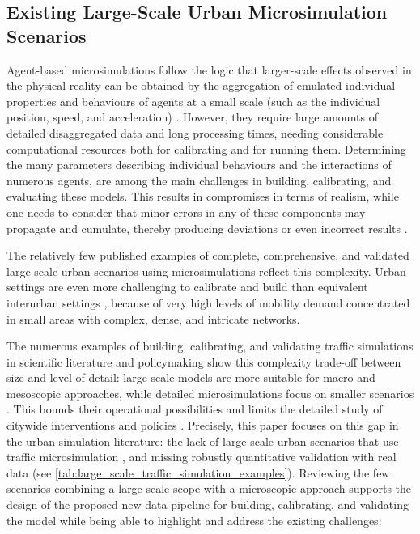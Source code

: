\subsection{Existing Large-Scale Urban Microsimulation Scenarios}
\label{subsec:GR_1.1_existing_large_scale_micro}

Agent-based microsimulations follow the logic that larger-scale effects observed in the physical reality can be obtained by the aggregation of emulated individual properties and behaviours of agents at a small scale (such as the individual position, speed, and acceleration) \citep{Helbing2010}. However, they require large amounts of detailed disaggregated data and long processing times, needing considerable computational resources both for calibrating and for running them. Determining the many parameters describing individual behaviours and the interactions of numerous agents, are among the main challenges in building, calibrating, and evaluating these models. This results in compromises in terms of realism, while one needs to consider that minor errors in any of these components may propagate and cumulate, thereby producing deviations or even incorrect results \citep{Heppenstall2012}.

The relatively few published examples of complete, comprehensive, and validated large-scale urban scenarios using microsimulations reflect this complexity. Urban settings are even more challenging to calibrate and build than equivalent interurban settings \citep{Kastner2014,Urquiza-Aguiar2019}, because of very high levels of mobility demand concentrated in small areas with complex, dense, and intricate networks.

The numerous examples of building, calibrating, and validating traffic simulations in scientific literature and policymaking \citep{Hourdos2008,Balakrishna2007,Oketch2005,Bartin2018,Rodriguez-Rey2021,Bassolas2019} show this complexity trade-off between size and level of detail: large-scale models are more suitable for macro and mesoscopic approaches, while detailed microsimulations focus on smaller scenarios \citep{Saidallah2016}. This bounds their operational possibilities and limits the detailed study of citywide interventions and policies \citep{Hardy2008}. Precisely, this paper focuses on this gap in the urban simulation literature: the lack of large-scale urban scenarios that use traffic microsimulation \citep{McKenney2013,Soares2014,Bieker2015}, and missing robustly quantitative validation with real data \citep{McKenney2013,Uppoor2011,Codeca2018,Rapelli2019,Behrisch2019,Gueriau2020,PereiraMachado2020} (see \autoref{tab:large_scale_traffic_simulation_examples}). Reviewing the few scenarios combining a large-scale scope with a microscopic approach supports the design of the proposed new data pipeline for building, calibrating, and validating the model while being able to highlight and address the existing challenges:

